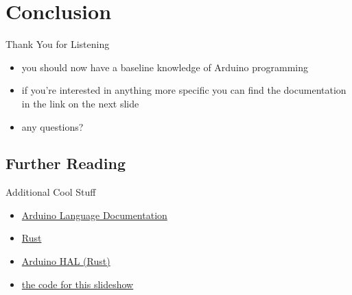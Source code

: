 \documentclass{beamer}
\newcommand{\link}[2]{\href{#1}{\color{blue}#2}}
\begin{document}
	\section{Conclusion}
	\begin{frame}{Thank You for Listening}
		\begin{itemize}
			\item you should now have a baseline knowledge of Arduino programming
			\item if you're interested in anything more specific you can find the documentation in the link on the next slide
			\item any questions?
		\end{itemize}
	\end{frame}

	\subsection{Further Reading}
	\begin{frame}{Additional Cool Stuff}
		\begin{itemize}
			\item \link{https://www.arduino.cc/reference/en/}{Arduino Language Documentation}
			\item \link{https://www.rust-lang.org/}{Rust}
			\item \link{https://rahix.github.io/avr-hal/arduino_hal/index.html}{Arduino HAL (Rust)}
			\item \link{https://github.com/NHS-Engineering/arduino\_masterclass}{the code for this slideshow}
		\end{itemize}
	\end{frame}
\end{document}
